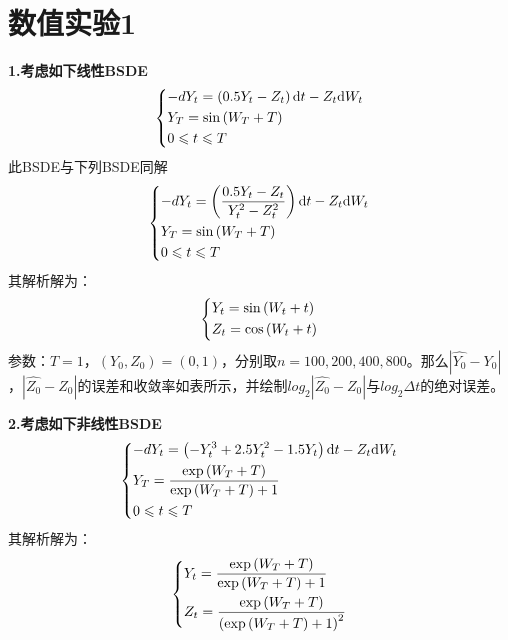 \section{数值实验1}
	\textbf{1.考虑如下线性BSDE}
			\begin{equation*}
			\centering
			\left\{\begin{lgathered}
			{ - d{Y_t} = \left( {0.5{Y_t} - {Z_t}} \right)\mathrm{d}t - {Z_t}\mathrm{d}{W_t}}\\
			{{Y_T} = \sin \left( {{W_T} + T} \right)}\\
			{0 \leqslant t \leqslant T}
			\end{lgathered} \right.
			\end{equation*}
	此BSDE与下列BSDE同解
			\begin{equation*}
			\centering
			\left\{\begin{lgathered}
			{ - d{Y_t} = \left( {\frac{{0.5{Y_t} - {Z_t}}}{{Y_t^2 - Z_t^2}}} \right)\mathrm{d}t - {Z_t}\mathrm{d}{W_t}}\\
			{{Y_T} = \sin \left( {{W_T} + T} \right)}\\
			{0 \leqslant t \leqslant T}
			\end{lgathered} \right.
			\end{equation*}
	其解析解为：
			\begin{equation*}
			\centering
			\left\{\begin{lgathered}
			{{Y_t} = \sin \left( {{W_t} + t} \right)}\\
			{{Z_t} = \cos \left( {{W_t} + t} \right)}
			\end{lgathered} \right.
			\end{equation*}
	参数：$T=1$，$(Y_0,Z_0)=(0,1)$，分别取$n=100,200,400,800$。那么$|\hat{Y_0}-{Y_0}|$ ，$|\hat{Z_0}-{Z_0}|$的误差和收敛率如表所示，并绘制${log}_2|\hat{Z_0}-{Z_0}|$与${log}_2\Delta t$的绝对误差。
	\par
	\textbf{2.考虑如下非线性BSDE}
			\begin{equation*}
		\centering
			\left\{\begin{lgathered}
			{ - d{Y_t} = \left( { - Y_t^3 + 2.5Y_t^2 - 1.5{Y_t}} \right)\mathrm{d}t - {Z_t}\mathrm{d}{W_t}}\\
			{{Y_T} = \frac{{\exp \left( {{W_T} + T} \right)}}{{\exp \left( {{W_T} + T} \right) + 1}}}\\
			{0 \leqslant t \leqslant T}
			\end{lgathered} \right.
			\end{equation*}
	 其解析解为：
		\begin{equation*}
			\centering
			\left\{\begin{lgathered}
			{{Y_t} = \frac{{\exp \left( {{W_T} + T} \right)}}{{\exp \left( {{W_T} + T} \right) + 1}}}\\
			{{Z_t} = \frac{{\exp \left( {{W_T} + T} \right)}}{{{{\left( {\exp \left( {{W_T} + T} \right) + 1} \right)}^2}}}}
			\end{lgathered} \right.
			\end{equation*}

